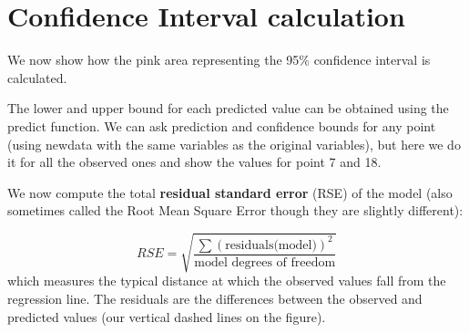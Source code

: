 \documentclass[
  letterpaper,
  DIV=11,
  numbers=noendperiod]{scrreprt}
\newenvironment{Shaded}{\begin{snugshade}}{\end{snugshade}}
\newcommand{\AttributeTok}[1]{\textcolor[rgb]{0.40,0.45,0.13}{#1}}
\newcommand{\CommentTok}[1]{\textcolor[rgb]{0.37,0.37,0.37}{#1}}
\newcommand{\DecValTok}[1]{\textcolor[rgb]{0.68,0.00,0.00}{#1}}
\newcommand{\FunctionTok}[1]{\textcolor[rgb]{0.28,0.35,0.67}{#1}}
\newcommand{\NormalTok}[1]{\textcolor[rgb]{0.00,0.23,0.31}{#1}}
\newcommand{\OtherTok}[1]{\textcolor[rgb]{0.00,0.23,0.31}{#1}}
\newcommand{\SpecialCharTok}[1]{\textcolor[rgb]{0.37,0.37,0.37}{#1}}
\newcommand{\StringTok}[1]{\textcolor[rgb]{0.13,0.47,0.30}{#1}}
\begin{document}
\section{Confidence Interval
calculation}\label{confidence-interval-calculation}

We now show how the pink area representing the 95\% confidence interval
is calculated.

The lower and upper bound for each predicted value can be obtained using
the predict function. We can ask prediction and confidence bounds for
any point (using newdata with the same variables as the original
variables), but here we do it for all the observed ones and show the
values for point 7 and 18.

\begin{Shaded}
\end{Shaded}

We now compute the total \textbf{residual standard error} (RSE) of the
model (also sometimes called the Root Mean Square Error though they are
slightly different):

\[RSE=\sqrt{\frac{\sum (\text{residuals(model)})^2}{\text{model degrees of freedom}}}\]
which measures the typical distance at which the observed values fall
from the regression line. The residuals are the differences between the
observed and predicted values (our vertical dashed lines on the figure).
\end{document}
